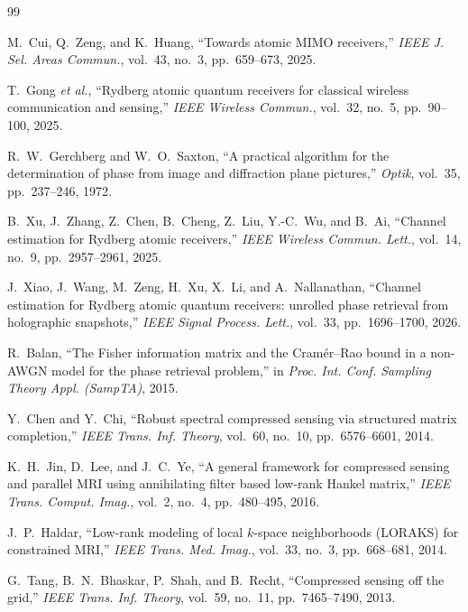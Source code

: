 \documentclass[journal]{IEEEtran}
\begin{document}
\begin{thebibliography}{99}

 M.~Cui, Q.~Zeng, and K.~Huang, ``Towards atomic MIMO
receivers,'' \emph{IEEE J. Sel. Areas Commun.}, vol.~43, no.~3, pp.~659--673,
2025.

 T.~Gong \emph{et al.}, ``Rydberg atomic quantum receivers
for classical wireless communication and sensing,'' \emph{IEEE Wireless
Commun.}, vol.~32, no.~5, pp.~90--100, 2025.

 R.~W.~Gerchberg and W.~O.~Saxton, ``A practical
algorithm for the determination of phase from image and diffraction plane
pictures,'' \emph{Optik}, vol.~35, pp.~237--246, 1972.

 B.~Xu, J.~Zhang, Z.~Chen, B.~Cheng, Z.~Liu, Y.-C.~Wu, and
B.~Ai, ``Channel estimation for Rydberg atomic receivers,'' \emph{IEEE Wireless
Commun. Lett.}, vol.~14, no.~9, pp.~2957--2961, 2025.

 J.~Xiao, J.~Wang, M.~Zeng, H.~Xu, X.~Li, and
A.~Nallanathan, ``Channel estimation for Rydberg atomic quantum receivers:
unrolled phase retrieval from holographic snapshots,'' \emph{IEEE Signal
Process. Lett.}, vol.~33, pp.~1696--1700, 2026.

 R.~Balan, ``The Fisher information matrix and the
Cram\'er--Rao bound in a non-AWGN model for the phase retrieval problem,'' in
\emph{Proc. Int. Conf. Sampling Theory Appl. (SampTA)}, 2015.

 Y.~Chen and Y.~Chi, ``Robust spectral compressed sensing
via structured matrix completion,'' \emph{IEEE Trans. Inf. Theory}, vol.~60,
no.~10, pp.~6576--6601, 2014.

 K.~H.~Jin, D.~Lee, and J.~C.~Ye, ``A general framework
for compressed sensing and parallel MRI using annihilating filter based
low-rank Hankel matrix,'' \emph{IEEE Trans. Comput. Imag.}, vol.~2, no.~4,
pp.~480--495, 2016.

 J.~P.~Haldar, ``Low-rank modeling of local $k$-space
neighborhoods (LORAKS) for constrained MRI,'' \emph{IEEE Trans. Med. Imag.},
vol.~33, no.~3, pp.~668--681, 2014.

 G.~Tang, B.~N.~Bhaskar, P.~Shah, and B.~Recht, ``Compressed
sensing off the grid,'' \emph{IEEE Trans. Inf. Theory}, vol.~59, no.~11,
pp.~7465--7490, 2013.


\end{thebibliography}
\end{document}
